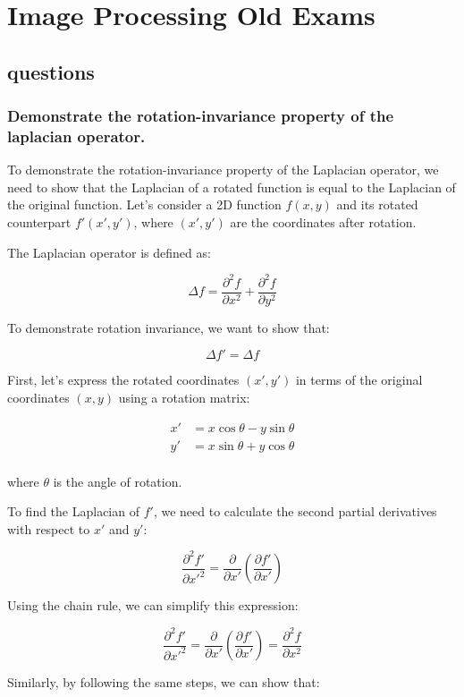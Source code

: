 \documentclass{article}
\begin{document}
\section{Image Processing Old Exams}
\subsection{questions}
\subsubsection{Demonstrate the rotation-invariance property of the laplacian operator.}
To demonstrate the rotation-invariance property of the Laplacian operator, we need to show that the Laplacian of a rotated function is equal to the Laplacian of the original function. Let's consider a 2D function $f(x, y)$ and its rotated counterpart $f'(x', y')$, where $(x', y')$ are the coordinates after rotation.

The Laplacian operator is defined as:

\[
\Delta f = \frac{\partial^2 f}{\partial x^2} + \frac{\partial^2 f}{\partial y^2}
\]

To demonstrate rotation invariance, we want to show that:

\[
\Delta f' = \Delta f
\]

First, let's express the rotated coordinates $(x', y')$ in terms of the original coordinates $(x, y)$ using a rotation matrix:

\[
\begin{aligned}
x' &= x\cos\theta - y\sin\theta \\
y' &= x\sin\theta + y\cos\theta \\
\end{aligned}
\]

where $\theta$ is the angle of rotation.

To find the Laplacian of $f'$, we need to calculate the second partial derivatives with respect to $x'$ and $y'$:

\[
\frac{\partial^2 f'}{\partial x'^2} = \frac{\partial}{\partial x'}\left(\frac{\partial f'}{\partial x'}\right)
\]

Using the chain rule, we can simplify this expression:

\[
\frac{\partial^2 f'}{\partial x'^2} = \frac{\partial}{\partial x'}\left(\frac{\partial f'}{\partial x'}\right) = \frac{\partial^2 f}{\partial x^2}
\]

Similarly, by following the same steps, we can show that:
\end{document}
